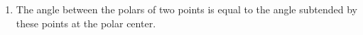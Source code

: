 \begin{enumerate}
%
%
%
%
%
%
%
%
%
%
%
%
%
%
%
%
%
%
%
%
%
%
%
%
%
%
%
%
%
%
%
%
%
%
%
%
%
%
%
%
%
%
%
%
%
%
\item The angle between the polars of two points is equal to the angle subtended
    by these points at the polar center.



\end{enumerate}
